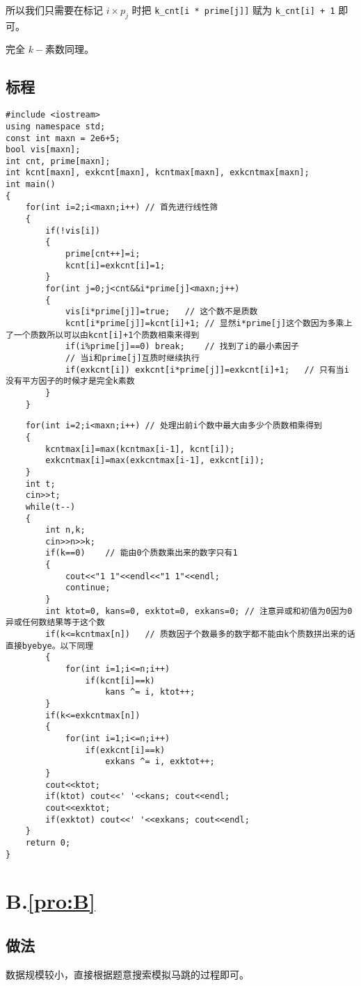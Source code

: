\documentclass[
    lang=cn,
    color=blue
]{elegantbook}
\newcommand{\solutionheader}[1]{
    \chapter*{#1.\quad \ref*{pro:#1}}
    \addcontentsline{toc}{chapter}{A.\ref*{pro:#1}}
}
\begin{document}
所以我们只需要在标记 $i\times p_j$ 时把 \verb|k_cnt[i * prime[j]]| 赋为 \verb|k_cnt[i] + 1| 即可。

完全 $k-$素数同理。

\section*{标程}
\begin{lstlisting}
#include <iostream>
using namespace std;
const int maxn = 2e6+5;
bool vis[maxn];
int cnt, prime[maxn];
int kcnt[maxn], exkcnt[maxn], kcntmax[maxn], exkcntmax[maxn];
int main()
{
    for(int i=2;i<maxn;i++) // 首先进行线性筛
    {
        if(!vis[i])
        {
            prime[cnt++]=i;
            kcnt[i]=exkcnt[i]=1;
        }
        for(int j=0;j<cnt&&i*prime[j]<maxn;j++)
        {
            vis[i*prime[j]]=true;   // 这个数不是质数
            kcnt[i*prime[j]]=kcnt[i]+1; // 显然i*prime[j]这个数因为多乘上了一个质数所以可以由kcnt[i]+1个质数相乘来得到
            if(i%prime[j]==0) break;    // 找到了i的最小素因子
            // 当i和prime[j]互质时继续执行
            if(exkcnt[i]) exkcnt[i*prime[j]]=exkcnt[i]+1;   // 只有当i没有平方因子的时候才是完全k素数
        }
    }
\end{lstlisting}
\newpage

\begin{lstlisting}
    for(int i=2;i<maxn;i++) // 处理出前i个数中最大由多少个质数相乘得到
    {
        kcntmax[i]=max(kcntmax[i-1], kcnt[i]);
        exkcntmax[i]=max(exkcntmax[i-1], exkcnt[i]);
    }
    int t;
    cin>>t;
    while(t--)
    {
        int n,k;
        cin>>n>>k;
        if(k==0)    // 能由0个质数乘出来的数字只有1
        {
            cout<<"1 1"<<endl<<"1 1"<<endl;
            continue;
        }
        int ktot=0, kans=0, exktot=0, exkans=0; // 注意异或和初值为0因为0异或任何数结果等于这个数
        if(k<=kcntmax[n])   // 质数因子个数最多的数字都不能由k个质数拼出来的话直接byebye。以下同理
        {
            for(int i=1;i<=n;i++)
                if(kcnt[i]==k)
                    kans ^= i, ktot++;
        }
        if(k<=exkcntmax[n])
        {
            for(int i=1;i<=n;i++)
                if(exkcnt[i]==k)
                    exkans ^= i, exktot++;
        }
        cout<<ktot;
        if(ktot) cout<<' '<<kans; cout<<endl;
        cout<<exktot;
        if(exktot) cout<<' '<<exkans; cout<<endl;
    }
    return 0;
}
\end{lstlisting}

\solutionheader{B}
\section*{做法}
数据规模较小，直接根据题意搜索模拟马跳的过程即可。
\end{document}
